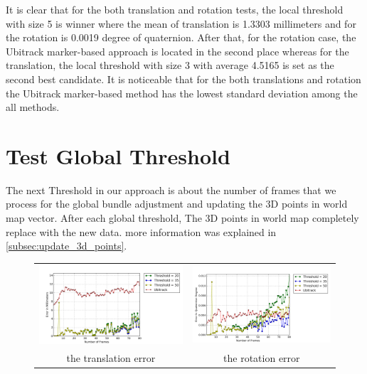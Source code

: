 It is clear that for the both translation and rotation tests, the local threshold with size 5 is winner where the mean of translation is 1.3303 millimeters and for the rotation is 0.0019 degree of quaternion. After that, for the rotation case, the Ubitrack marker-based approach is located in the second place whereas for the translation, the local threshold with size 3 with average 4.5165 is set as the second best candidate. It is noticeable that for the both translations and rotation the Ubitrack marker-based method has the lowest standard deviation among the all methods.

\section{Test Global Threshold} \label{sec:global_threshold}
The next Threshold in our approach is about the number of frames that we process for the global bundle adjustment and updating the 3D points in world map vector. After each global threshold, The 3D points in world map completely replace with the new data. more information was explained in \autoref{subsec:update_3d_points}.
\begin{figure}[H]
\centering
\begin{tabular}{cc}
  \includegraphics[width=80mm]{figures/global/graph_translation} &   \includegraphics[width=80mm]{figures/global/graph_rotation}  \\
  the translation error & the rotation error \\[6pt]
\end{tabular}
\caption{}\label{fig:test_global_threshold}

\end{figure}
